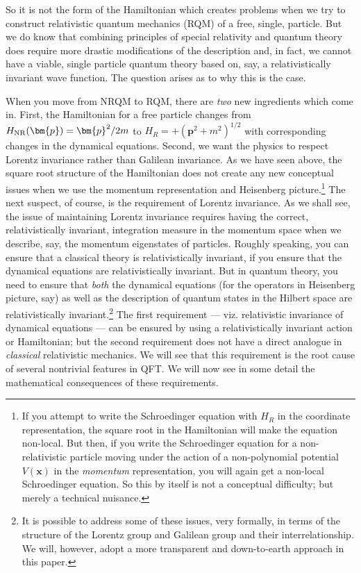 \documentclass[12pt]{article}
\begin{document}
 So it is not the form of the Hamiltonian which creates problems when we try to construct relativistic quantum mechanics (RQM) of a free, single, particle. But we do know that combining principles of special relativity and quantum theory does require more drastic modifications of the description and, in fact, we cannot have a viable, single particle quantum theory based on, say, a relativistically invariant wave function. The question arises as to why this is the case.
 
 
When you move from NRQM to RQM, there are \textit{two}  new ingredients which come in. First, the Hamiltonian for a free particle changes from $H_{\rm NR}(\bm{p}) = \bm{p}^2/2m$ to $H_R=+(\bm{p}^2 + m^2)^{1/2}$ with corresponding changes in the dynamical equations. Second, we want the physics to respect Lorentz invariance rather than Galilean invariance. 
As we have seen above, the square root structure of the Hamiltonian does not create any new conceptual issues when we use the momentum representation and Heisenberg picture.\footnote{If you attempt to write the Schroedinger equation with $H_R$ in the coordinate representation, the square root in the Hamiltonian will make the equation non-local. But then, if you write the Schroedinger equation for a non-relativistic particle moving under the action of  a non-polynomial potential $V(\bm{x})$ in the \textit{momentum} representation, you will again get a non-local Schroedinger equation. So this by itself is not a conceptual difficulty; but merely a technical nuisance.}
The next suspect, of course, is the requirement of Lorentz invariance. As we shall see,
 the issue of maintaining Lorentz invariance requires having the correct, relativistically invariant, integration measure in the momentum space when we describe, say, the momentum eigenstates of particles.  Roughly speaking, you can ensure that a classical theory is relativistically invariant, if you ensure that the dynamical equations are relativistically invariant. But in quantum theory, you need to ensure that \textit{both} the dynamical equations (for the operators in Heisenberg picture, say) as well as the description of quantum states in the Hilbert space are relativistically invariant.\footnote{It is possible to address some of these issues, very formally, in terms of the structure of the Lorentz group and Galilean group and their interrelationship. We will, however, adopt a more transparent and down-to-earth approach in this paper.} The first requirement --- viz. relativistic invariance of dynamical equations --- can be ensured by using a relativistically invariant action or Hamiltonian; but the second requirement  does not have a direct analogue in \textit{classical} relativistic mechanics. We will see that this requirement is the root cause of several nontrivial features in QFT.
  We will now see in some detail the mathematical consequences of these requirements.
  
\end{document}
